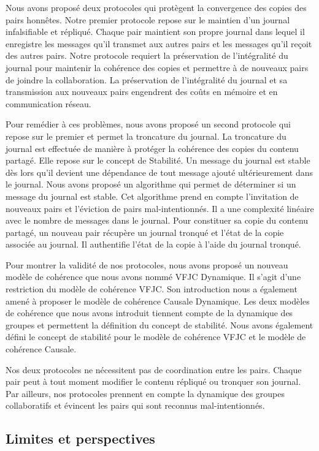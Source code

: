 Nous avons proposé deux protocoles qui protègent la convergence des copies des pairs honnêtes.
Notre premier protocole repose sur le maintien d'un journal infalsifiable et répliqué.
Chaque pair maintient son propre journal dans lequel il enregistre les messages qu'il transmet aux autres pairs et les messages qu'il reçoit des autres pairs.
Notre protocole requiert la préservation de l'intégralité du journal pour maintenir la cohérence des copies et permettre à de nouveaux pairs de joindre la collaboration.
La préservation de l'intégralité du journal et sa transmission aux nouveaux pairs engendrent des coûts en mémoire et en communication réseau.

Pour remédier à ces problèmes, nous avons proposé un second protocole qui repose sur le premier et permet la troncature du journal.
La troncature du journal est effectuée de manière à protéger la cohérence des copies du contenu partagé.
Elle repose sur le concept de Stabilité.
Un message du journal est stable dès lors qu'il devient une dépendance de tout message ajouté ultérieurement dans le journal.
Nous avons proposé un algorithme qui permet de déterminer si un message du journal est stable.
Cet algorithme prend en compte l'invitation de nouveaux pairs et l'éviction de pairs mal-intentionnés.
Il a une complexité linéaire avec le nombre de messages dans le journal.
Pour constituer sa copie du contenu partagé, un nouveau pair récupère un journal tronqué et l'état de la copie associée au journal.
Il authentifie l'état de la copie à l'aide du journal tronqué.

Pour montrer la validité de nos protocoles, nous avons proposé un nouveau modèle de cohérence que nous avons nommé \acl{VFJC} Dynamique.
Il s'agit d'une restriction du modèle de cohérence \acf{VFJC}.
Son introduction nous a également amené à proposer le modèle de cohérence Causale Dynamique.
Les deux modèles de cohérence que nous avons introduit tiennent compte de la dynamique des groupes et permettent la définition du concept de stabilité.
Nous avons également défini le concept de stabilité pour le modèle de cohérence \acs{VFJC} et le modèle de cohérence Causale.

Nos deux protocoles ne nécessitent pas de coordination entre les pairs.
Chaque pair peut à tout moment modifier le contenu répliqué ou tronquer son journal.
Par ailleurs, nos protocoles prennent en compte la dynamique des groupes collaboratifs et évincent les pairs qui sont reconnus mal-intentionnés.

\subsection{Limites et perspectives}

